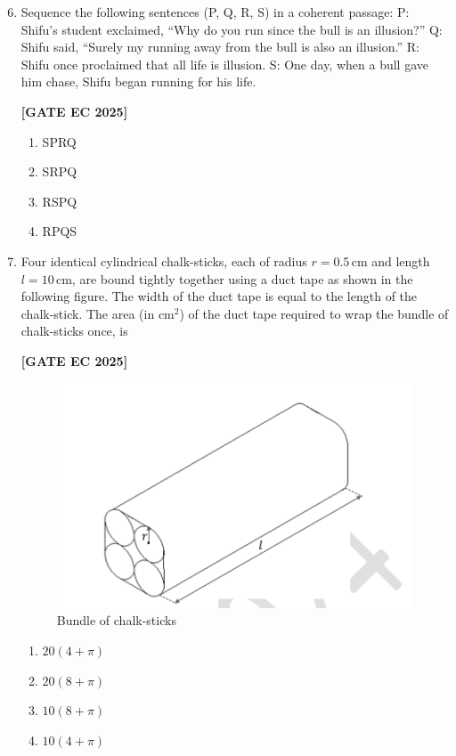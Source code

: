 \documentclass[12pt]{article}
\begin{document}
\begin{enumerate}[leftmargin=1.5em, label=\textbf{Q.\arabic*}., itemsep=2em]
\setcounter{enumi}{5}

\item Sequence the following sentences (P, Q, R, S) in a coherent passage:  
P: Shifu’s student exclaimed, “Why do you run since the bull is an illusion?”  
Q: Shifu said, “Surely my running away from the bull is also an illusion.”  
R: Shifu once proclaimed that all life is illusion.  
S: One day, when a bull gave him chase, Shifu began running for his life.

\noindent \textbf{[GATE EC 2025]}
\begin{multicols}{2}
\begin{enumerate}
    \item SPRQ
    \item SRPQ
    \item RSPQ
    \item RPQS
\end{enumerate}
\end{multicols}

\item Four identical cylindrical chalk-sticks, each of radius $r = 0.5 \,\text{cm}$ and length $l = 10 \,\text{cm}$, are bound tightly together using a duct tape as shown in the following figure.  
The width of the duct tape is equal to the length of the chalk-stick. The area (in cm$^2$) of the duct tape required to wrap the bundle of chalk-sticks once, is

\noindent \textbf{[GATE EC 2025]}
\begin{figure}[H]\centering
\includegraphics[width=0.5\columnwidth]{figs/q7.png}
\caption{Bundle of chalk-sticks}
\label{fig:q7}
\end{figure}
\begin{multicols}{2}
\begin{enumerate}
    \item $20(4+\pi)$
    \item $20(8+\pi)$
    \item $10(8+\pi)$
    \item $10(4+\pi)$
\end{enumerate}
\end{multicols}


\end{enumerate}
\end{document}
